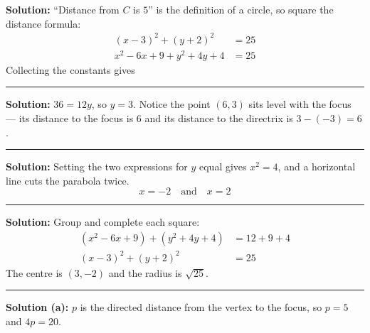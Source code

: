 \documentclass[12pt]{article}
\begin{document}



\textbf{Solution:} ``Distance from $C$ is $5$'' is the definition of a circle, so square the distance formula:
\begin{align*}
  (x-3)^{2} + (y+2)^{2} &= 25 \\
  x^{2} - 6x + 9 + y^{2} + 4y + 4 &= 25
\end{align*}
Collecting the constants gives 

\vspace{0.1cm}\noindent\rule{\linewidth}{0.2pt}


\textbf{Solution:} $36 = 12y$, so $y = 3$. Notice the point $(6, 3)$ sits level with the focus --- its distance to the focus is $6$ and its distance to the directrix is $3 - (-3) = 6$. 

\vspace{0.1cm}\noindent\rule{\linewidth}{0.2pt}


\textbf{Solution:} Setting the two expressions for $y$ equal gives $x^{2} = 4$, and a horizontal line cuts the parabola twice.
\[ \boxed{x = -2 \quad \text{and} \quad x = 2} \]

\vspace{0.1cm}\noindent\rule{\linewidth}{0.2pt}


\textbf{Solution:} Group and complete each square:
\begin{align*}
  \left(x^{2} - 6x + 9\right) + \left(y^{2} + 4y + 4\right) &= 12 + 9 + 4 \\
  (x - 3)^{2} + (y + 2)^{2} &= 25
\end{align*}
The centre is $(3, -2)$ and the radius is $\sqrt{25}$. 

\vspace{0.1cm}\noindent\rule{\linewidth}{0.2pt}


\textbf{Solution (a):} $p$ is the directed distance from the vertex to the focus, so $p = 5$ and $4p = 20$. 
\end{document}
